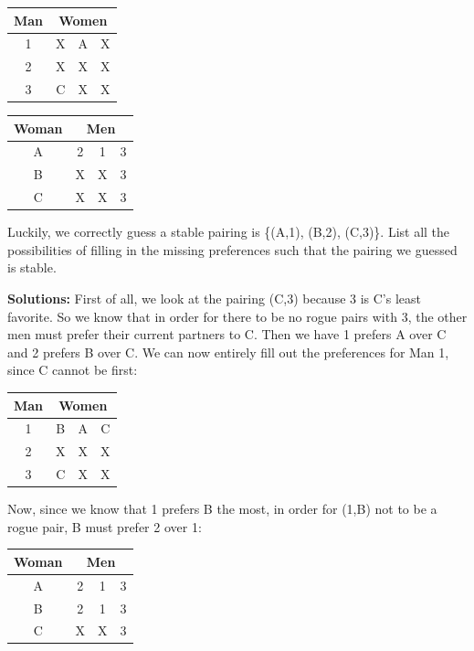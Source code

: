 \documentclass[11pt]{article}
\newif\ifsolutions
\renewcommand{\answer}[1]{{\color{mydarkblue}\textbf{Solutions: }#1}}
\begin{document}
\begin{qunlist}
\begin{itemize}
\begin{center}
\begin{tabular}{|c|ccc|}\hline 
Man&\multicolumn{3}{|c|}{Women}\\\hline 
1&X&A&X\\\hline 
2&X&X&X\\\hline 
3&C&X&X\\\hline
\end{tabular} 
\hspace{2cm}
\begin{tabular}{|c|ccc|}\hline 
Woman&\multicolumn{3}{|c|}{Men}\\\hline 
A&2&1&3\\\hline 
B&X&X&3\\\hline 
C&X&X&3\\\hline
\end{tabular}
\end{center}
        
Luckily, we correctly guess a stable pairing is \{(A,1), (B,2), (C,3)\}. 
List all the possibilities of filling in the missing preferences such that the pairing we guessed is stable.

\ifsolutions
\answer{
First of all, we look at the pairing (C,3) because 3 is C's least favorite. 
So we know that in order for there to be no rogue pairs with 3, 
the other men must prefer their current partners to C. 
Then we have 1 prefers A over C and 2 prefers B over C. 
We can now entirely fill out the preferences for Man 1, since C cannot be first:

\begin{center}
\begin{tabular}{|c|ccc|}\hline 
Man&\multicolumn{3}{|c|}{Women}\\\hline 
1&B&A&C\\\hline 
2&X&X&X\\\hline 
3&C&X&X\\\hline
\end{tabular} 
\end{center}

Now, since we know that 1 prefers B the most, in order for (1,B) not to be a rogue pair, 
B must prefer 2 over 1:

\begin{center}
\begin{tabular}{|c|ccc|}\hline 
Woman&\multicolumn{3}{|c|}{Men}\\\hline 
A&2&1&3\\\hline 
B&2&1&3\\\hline 
C&X&X&3\\\hline
\end{tabular}
\end{center}

}
\end{itemize}
\end{qunlist}
\end{document}
